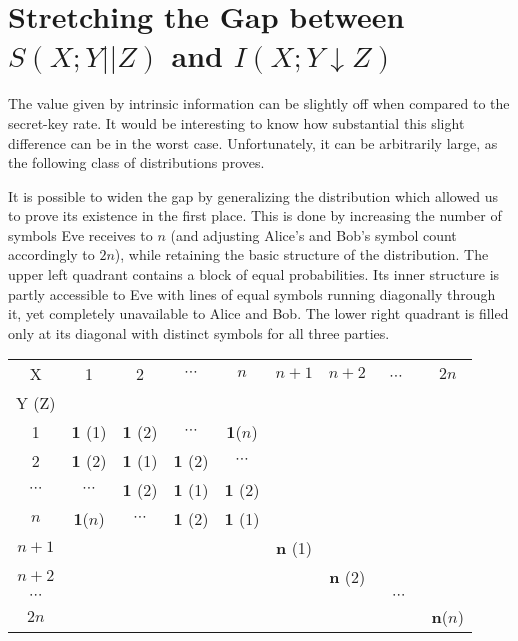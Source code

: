 \documentclass[a4paper, twoside, openany]{report}
\newcommand{\intrivar}[3]{I(#1;#2\!\!\downarrow\!#3)}
\newcommand{\intri}{\intrivar{X}{Y}{Z}}
\newcommand{\srate}{S(X;Y||Z)}
\newcommand{\p}[1]{\textbf{#1}}
\theoremstyle{plain}
\theoremstyle{definition}
\begin{document}

\newpage

\section{Stretching the Gap between $\srate$ and $\intri$}

The value given by intrinsic information can be slightly off when compared to the secret-key rate. It would be interesting to know how substantial this slight difference can be in the worst case. Unfortunately, it can be arbitrarily large, as the following class of distributions proves.

It is possible to widen the gap by generalizing the distribution which allowed us to prove its existence in the first place. This is done by increasing the number of symbols Eve receives to $n$ (and adjusting Alice's and Bob's symbol count accordingly to $2n$), while retaining the basic structure of the distribution. The upper left quadrant contains a block of equal probabilities. Its inner structure is partly accessible to Eve with lines of equal symbols running diagonally through it, yet completely unavailable to Alice and Bob. The lower right quadrant is filled only at its diagonal with distinct symbols for all three parties.

\begin{center}
\begin{tabular}{|c||c|c|c|c||c|c|c|c|}
\hline
X        &     1     &     2     & $\cdots$  &    $n$    &   $n+1$   &   $n+2$   & \ $\cdots$ \ &   $2n$    \\
Y (Z)    &           &           &           &           &           &           &           &           \\
\hline\hline
1        & \p{1} (1) & \p{1} (2) & $\cdots$  & \p{1}($n$)&           &           &           &           \\
\hline
2        & \p{1} (2) & \p{1} (1) & \p{1} (2) & $\cdots$  &           &           &           &           \\
\hline
$\cdots$ & $\cdots$  & \p{1} (2) & \p{1} (1) & \p{1} (2) &           &           &           &           \\
\hline
$n$      & \p{1}($n$)& $\cdots$  & \p{1} (2) & \p{1} (1) &           &           &           &           \\
\hline\hline
$n+1$    &           &           &           &           & \p{n} (1) &           &           &           \\
\hline
$n+2$    &           &           &           &           &           & \p{n} (2) &           &           \\
\hline
$\cdots$ &           &           &           &           &           &           & $\cdots$  &           \\
\hline
$2n$     &           &           &           &           &           &           &           & \p{n}($n$)\\
\hline
\end{tabular}
\end{center}
\end{document}
